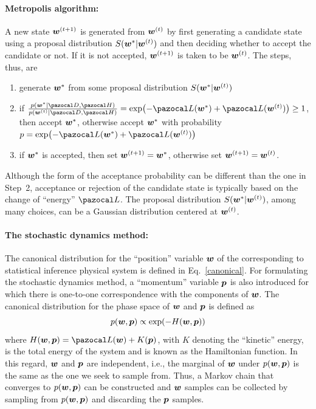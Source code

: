 \paragraph{Metropolis algorithm:}
A new state $\boldsymbol{w}^{(t+1)}$ is generated from $\boldsymbol{w}^{(t)}$ by first generating a candidate state using a proposal distribution $S(\boldsymbol{w}^*|\boldsymbol{w}^{(t)})$ and then deciding whether to accept the candidate or not. 
If it is not accepted, $\boldsymbol{w}^{(t+1)}$ is taken to be $\boldsymbol{w}^{(t)}$.
The steps, thus, are
\begin{enumerate}
	\item generate $\boldsymbol{w}^*$ from some proposal distribution $S(\boldsymbol{w}^*|\boldsymbol{w}^{(t)})$
	\item if $\frac{p(\bw^*|\cD,\cH)}{p(\bw^{(t)}|\cD,\cH)} = \exp(-\cL(\bw^*)+\cL(\bw^{(t)}))\geq 1$, then accept $\boldsymbol{w}^*$, otherwise accept $\boldsymbol{w}^*$ with probability $p = \exp(-\cL(\bw^*)+\cL(\bw^{(t)}))$
	\item if $\boldsymbol{w}^*$ is accepted, then set $\boldsymbol{w}^{(t+1)} = \boldsymbol{w}^*$, otherwise set $\boldsymbol{w}^{(t+1)} = \boldsymbol{w}^{(t)}$. 
\end{enumerate}
Although the form of the acceptance probability can be different than the one in Step~2, acceptance or rejection of the candidate state is typically based on the change of ``energy'' $\cL$.
The proposal distribution $S(\boldsymbol{w}^*|\boldsymbol{w}^{(t)})$, among many choices, can be a Gaussian distribution centered at $\boldsymbol{w}^{(t)}$. 

\paragraph{The stochastic dynamics method:}
The canonical distribution for the ``position'' variable $\boldsymbol{w}$ of the corresponding to statistical inference physical system is defined in Eq.~\eqref{canonical}.
For formulating the stochastic dynamics method, a ``momentum'' variable $\boldsymbol{p}$ is also introduced for which there is one-to-one correspondence with the components of $\boldsymbol{w}$.
The canonical distribution for the phase space of $\boldsymbol{w}$ and $\boldsymbol{p}$ is defined as 
\begin{equation}
p(\boldsymbol{w},\boldsymbol{p}) \propto \exp(-H(\boldsymbol{w},\boldsymbol{p}))
\end{equation}
where $H(\bw,\bp) = \cL(\bw) + K(\bp)$, with $K$ denoting the ``kinetic'' energy, is the total energy of the system and is known as the Hamiltonian function. 
In this regard, $\boldsymbol{w}$ and $\boldsymbol{p}$ are independent, i.e., the marginal of $\boldsymbol{w}$ under $p(\boldsymbol{w},\boldsymbol{p})$ is the same as the one we seek to sample from. 
Thus, a Markov chain that converges to $p(\boldsymbol{w},\boldsymbol{p})$ can be constructed and $\boldsymbol{w}$ samples can be collected by sampling from $p(\boldsymbol{w},\boldsymbol{p})$ and discarding the $\boldsymbol{p}$ samples.

